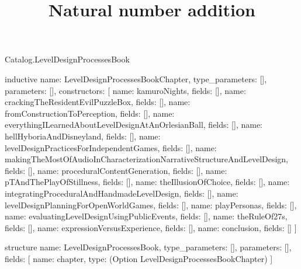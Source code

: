 \begin{lexlean}{Catalog.LevelDesignProcessesBook}
\title{Natural number addition}
\begin{semanticmodule}
inductive{
  name: LevelDesignProcessesBookChapter,
  type_parameters: [],
  parameters: [],
  constructors: [
    {name: kamuroNights, fields: []},
    {name: crackingTheResidentEvilPuzzleBox, fields: []},
    {name: fromConstructionToPerception, fields: []},
    {name: everythingILearnedAboutLevelDesignAtAnOrlesianBall, fields: []},
    {name: hellHyboriaAndDisneyland, fields: []},
    {name: levelDesignPracticesForIndependentGames, fields: []},
    {name: makingTheMostOfAudioInCharacterizationNarrativeStructureAndLevelDesign, fields: []},
    {name: proceduralContentGeneration, fields: []},
    {name: pTAndThePlayOfStillness, fields: []},
    {name: theIllusionOfChoice, fields: []},
    {name: integratingProceduralAndHandmadeLevelDesign, fields: []},
    {name: levelDesignPlanningForOpenWorldGames, fields: []},
    {name: playPersonas, fields: []},
    {name: evaluatingLevelDesignUsingPublicEvents, fields: []},
    {name: theRuleOf27s, fields: []},
    {name: expressionVersusExperience, fields: []},
    {name: conclusion, fields: []}
  ]
}

structure{
  name: LevelDesignProcessesBook,
  type_parameters: [],
  parameters: [],
  fields: [
    {name: chapter, type: (Option LevelDesignProcessesBookChapter)}
  ]
}
\end{semanticmodule}
\end{lexlean}
